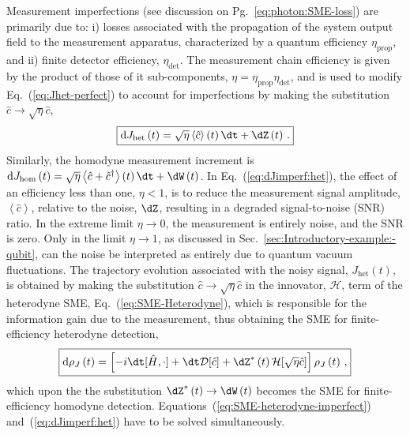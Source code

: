 Measurement imperfections (see discussion on Pg.~\ref{eq:photon:SME-loss})
are primarily due to: i) losses associated with the propagation of
the system output field to the measurement apparatus, characterized
by a quantum efficiency $\eta_{\mathrm{prop}}$, and ii) finite detector
efficiency, $\eta_{\mathrm{det}}$. The measurement chain efficiency
is given by the product of those of it sub-components, $\eta=\eta_{\mathrm{prop}}\eta_{\mathrm{det}}$,
and is used to modify Eq.~(\ref{eq:Jhet-perfect}) to account for
imperfections by making the substitution $\hat{c}\rightarrow\sqrt{\eta}\hat{c}$,
\begin{equation}
\boxed{\mathrm{d}J_{\mathrm{het}}\left(t\right)=\sqrt{\eta}\left\langle \hat{c}\right\rangle \left(t\right)\dt+\dZ\left(t\right)\,.}\label{eq:dJimperf:het}
\end{equation}
Similarly, the homodyne measurement increment is $\mathrm{d}J_{\mathrm{hom}}\left(t\right)=\sqrt{\eta}\left\langle \hat{c}+\hat{c}^{\dagger}\right\rangle \left(t\right)\dt+\dW\left(t\right)$.
In Eq.~(\ref{eq:dJimperf:het}), the effect of an efficiency less
than one, $\eta<1$, is to reduce the measurement signal amplitude,
$\left\langle \hat{c}\right\rangle $, relative to the noise, $\dZ$,
resulting in a degraded signal-to-noise (SNR) ratio. In the extreme
limit $\eta\rightarrow0$, the measurement is entirely noise, and
the SNR is zero. Only in the limit $\eta\rightarrow1$, as discussed
in Sec.~\ref{sec:Introductory-example:-qubit}, can the noise be
interpreted as entirely due to quantum vacuum fluctuations.  The
trajectory evolution associated with the noisy signal, $J_{\mathrm{het}}\left(t\right)$,
is obtained by making the substitution $\hat{c}\rightarrow\sqrt{\eta}\hat{c}$
in the innovator, $\mathcal{H}$, term of the heterodyne SME, Eq.~(\ref{eq:SME-Heterodyne}),
which is responsible for the information gain due to the measurement,
thus obtaining the SME for finite-efficiency heterodyne detection,
\begin{equation}
\boxed{\mathrm{d}\rho_{J}\left(t\right)=\left[-i\dt[\hat{H},\cdot]+\dt\mathcal{D}[\hat{c}]+\dZ^{*}\left(t\right)\mathcal{H}[\sqrt{\eta}\hat{c}]\right]\rho_{J}\left(t\right)\,,}\label{eq:SME-heterodyne-imperfect}
\end{equation}
which upon the the substitution $\dZ^{*}\left(t\right)\rightarrow\dW\left(t\right)$
becomes the SME for finite-efficiency homodyne detection. Equations~(\ref{eq:SME-heterodyne-imperfect})
and~(\ref{eq:dJimperf:het}) have to be solved simultaneously.

